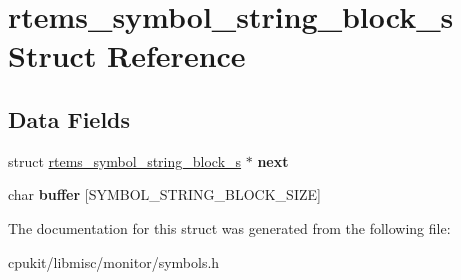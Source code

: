 \hypertarget{structrtems__symbol__string__block__s}{}\section{rtems\+\_\+symbol\+\_\+string\+\_\+block\+\_\+s Struct Reference}
\label{structrtems__symbol__string__block__s}
\subsection*{Data Fields}
\begin{DoxyCompactItemize}
\item 
\mbox{\label{structrtems__symbol__string__block__s_abc2686d2dcd9aaeb81c3f88467606f87}} 
struct \mbox{\hyperlink{structrtems__symbol__string__block__s}{rtems\+\_\+symbol\+\_\+string\+\_\+block\+\_\+s}} $\ast$ {\bfseries next}
\item 
\mbox{\label{structrtems__symbol__string__block__s_af22cdf46e7b7657d5e7b01558b9d3e56}} 
char {\bfseries buffer} \mbox{[}S\+Y\+M\+B\+O\+L\+\_\+\+S\+T\+R\+I\+N\+G\+\_\+\+B\+L\+O\+C\+K\+\_\+\+S\+I\+ZE\mbox{]}
\end{DoxyCompactItemize}


The documentation for this struct was generated from the following file\+:\begin{DoxyCompactItemize}
\item 
cpukit/libmisc/monitor/symbols.\+h\end{DoxyCompactItemize}
